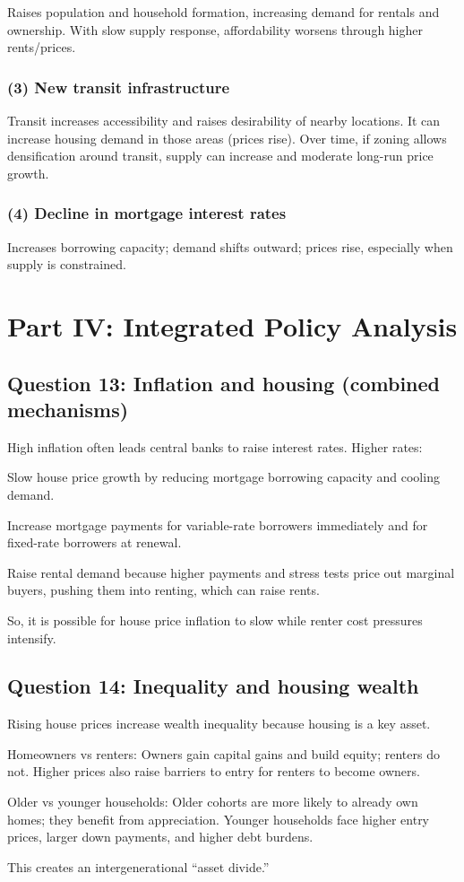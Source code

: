 \documentclass[11pt]{article}
\begin{document}
Raises population and household formation, increasing demand for rentals and ownership. With slow supply response, affordability worsens through higher rents/prices.

\subsubsection*{(3) New transit infrastructure}

Transit increases accessibility and raises desirability of nearby locations. It can increase housing demand in those areas (prices rise). Over time, if zoning allows densification around transit, supply can increase and moderate long-run price growth.

\subsubsection*{(4) Decline in mortgage interest rates}

Increases borrowing capacity; demand shifts outward; prices rise, especially when supply is constrained.

\section*{Part IV: Integrated Policy Analysis}

\subsection*{Question 13: Inflation and housing (combined mechanisms)}

High inflation often leads central banks to raise interest rates. Higher rates:

Slow house price growth by reducing mortgage borrowing capacity and cooling demand.

Increase mortgage payments for variable-rate borrowers immediately and for fixed-rate borrowers at renewal.

Raise rental demand because higher payments and stress tests price out marginal buyers, pushing them into renting, which can raise rents.

So, it is possible for house price inflation to slow while renter cost pressures intensify.

\subsection*{Question 14: Inequality and housing wealth}

Rising house prices increase wealth inequality because housing is a key asset.

Homeowners vs renters: Owners gain capital gains and build equity; renters do not. Higher prices also raise barriers to entry for renters to become owners.

Older vs younger households: Older cohorts are more likely to already own homes; they benefit from appreciation. Younger households face higher entry prices, larger down payments, and higher debt burdens.

This creates an intergenerational “asset divide.”
\end{document}
